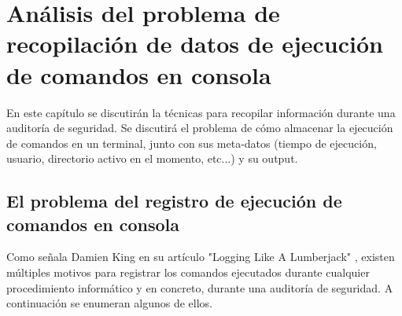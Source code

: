 \chapter{Análisis del problema de recopilación de datos de ejecución de comandos en consola\label{cap:Registro}}

En este capítulo se discutirán la técnicas para recopilar información durante una auditoría de seguridad. Se discutirá el problema de cómo almacenar la ejecución de comandos en un terminal, junto con sus meta-datos (tiempo de ejecución, usuario, directorio activo en el momento, etc...) y su output. 


\section{El problema del registro de ejecución de comandos en consola}

Como señala Damien King en su artículo "Logging Like A Lumberjack" \cite{logging}, existen múltiples motivos para registrar los comandos ejecutados durante cualquier procedimiento informático y en concreto, durante una auditoría de seguridad. A continuación se enumeran algunos de ellos.

